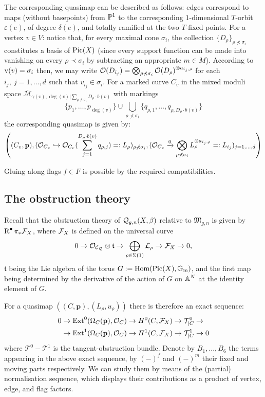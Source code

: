 The corresponding quasimap can be described as follows: edges correspond to maps (without basepoints) from $\mathbb P^1$ to the corresponding $1$-dimensional $T$-orbit $\varepsilon(e)$, of degree $\delta(e)$, and totally ramified at the two $T$-fixed points. For a vertex $v\in V$: notice that, for every maximal cone $\sigma_i$, the collection $\{D_\rho\}_{\rho\nprec\sigma_i}$ constitutes a basis of $\operatorname{Pic}(X)$ (since every support function can be made into vanishing on every $\rho\prec\sigma_i$ by subtracting an appropriate $m\in M$). According to $\operatorname{v}(v)=\sigma_i$ then, we may write $\mathcal{O}(D_{i_j})=\bigotimes_{\rho\nprec\sigma_i} \mathcal{O}(D_\rho)^{\otimes a_{i_j,\rho}}$ for each $i_j,\ j=1,\ldots,d$ such that $v_{i_j}\in \sigma_i$. For a marked curve $C_v$ in the mixed moduli space $\overline{\mathcal M}_{\gamma(v),\deg(v)|\sum_{\rho\nprec \sigma_i}D_\rho\cdot b(v)}$ with markings
\[
 \{p_1,\ldots,p_{\deg(v)}\}\cup\bigcup_{\rho\nprec\sigma_i}\{q_{\rho,1},\ldots,q_{\rho,D_{\rho}\cdot b(v)}\}
\]
the corresponding quasimap is given by:
\[
 \left((C_v,\mathbf p),(\mathcal O_{C_v}\hookrightarrow\mathcal{O}_{C_v}(\sum_{j=1}^{D_{\rho}\cdot b(v) }q_{\rho,j})=:L_\rho)_{\rho\nprec\sigma_i},(\mathcal O_{C_v}\xrightarrow{0}\bigotimes_{\rho\nprec\sigma_i} L_\rho^{\otimes a_{i_j,\rho}}=:L_{i_j})_{j=1,\ldots,d} \right)
\]

Gluing along flags $f\in F$ is possible by the required compatibilities.

\subsection{The obstruction theory} Recall that the obstruction theory of $\mathcal{Q}_{g,n}(X,\beta)$ relative to $\mathfrak M_{g,n}$ is given by $\operatorname{R}^{\bullet}\pi_*\mathcal F_X$, where $\mathcal F_X$ is defined on the universal curve
\begin{equation}\label{eqn:F}
 0\rightarrow\mathcal{O}_{\mathcal C_\mathcal Q}\otimes \mathfrak t\rightarrow\bigoplus_{\rho\in\Sigma(1)}\mathcal L_\rho\rightarrow\mathcal F_X\rightarrow 0,
\end{equation}
$\mathfrak t$ being the Lie algebra of the torus $G:=\operatorname{Hom}(\operatorname{Pic}(X),\mathbb{G}_{\text{m}})$, and the first map being determined by the derivative of the action of $G$ on $\mathbb{A}^N$ at the identity element of $G$.

For a quasimap $\left((C,\mathbf p),(L_{\rho},u_{\rho})\right)$ there is therefore an exact sequence:
\begin{align*}
 0&\rightarrow \operatorname{Ext}^0(\Omega_C(\mathbf p),\mathcal{O}_C)\rightarrow H^0(C,\mathcal F_X)\rightarrow \mathcal T^0_{|C}\rightarrow \\
  &\rightarrow \operatorname{Ext}^1(\Omega_C(\mathbf p),\mathcal{O}_C)\rightarrow H^1(C,\mathcal F_X)\rightarrow \mathcal T^1_{|C}\rightarrow 0
\end{align*}
where $\mathcal T^0-\mathcal T^1$ is the tangent-obstruction bundle.
Denote by $B_1,\ldots, B_6$ the terms appearing in the above exact sequence, by $(-)^f$ and $(-)^m$ their fixed and moving parts respectively. We can study them by means of the (partial) normalisation sequence, which displays their contributions as a product of vertex, edge, and flag factors.

